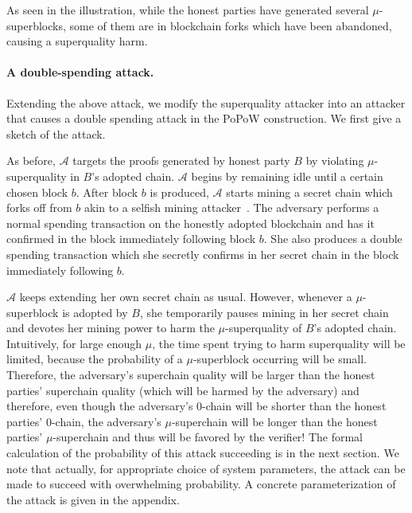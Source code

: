 As seen in the illustration, while the honest parties have generated several
$\mu$-superblocks, some of them are in blockchain forks which have been
abandoned, causing a superquality harm.

\paragraph{A double-spending attack.}
Extending the above attack, we modify the superquality attacker into an attacker
that causes a double spending attack in the PoPoW construction. We first give
a sketch of the attack.

As before, $\mathcal{A}$ targets the proofs generated by honest party $B$ by
violating $\mu$-superquality in $B$'s adopted chain. $\mathcal{A}$ begins by
remaining idle until a certain chosen block $b$. After block $b$ is produced,
$\mathcal{A}$ starts mining a secret chain which forks off from $b$ akin to a
selfish mining attacker~\cite{selfish}. The adversary performs a normal spending
transaction on the honestly adopted blockchain and has it confirmed in the block
immediately following block $b$. She also produces a double spending transaction
which she secretly confirms in her secret chain in the block immediately
following $b$.

$\mathcal{A}$ keeps extending her own secret chain as usual. However, whenever a
$\mu$-superblock is adopted by $B$, she temporarily pauses mining in her secret
chain and devotes her mining power to harm the $\mu$-superquality of $B$'s
adopted chain. Intuitively, for large enough $\mu$, the time spent trying to
harm superquality will be limited, because the probability of a $\mu$-superblock
occurring will be small. Therefore, the adversary's superchain quality will be
larger than the honest parties' superchain quality (which will be harmed by the
adversary) and therefore, even though the adversary's $0$-chain will be shorter
than the honest parties' $0$-chain, the adversary's $\mu$-superchain will be
longer than the honest parties' $\mu$-superchain and thus will be favored by the
verifier! The formal calculation of the probability of this attack succeeding is
in the next section. We note that  actually, for appropriate choice of system
parameters, the attack can be made to succeed with overwhelming probability.
A concrete parameterization of the attack is given in the
appendix.

